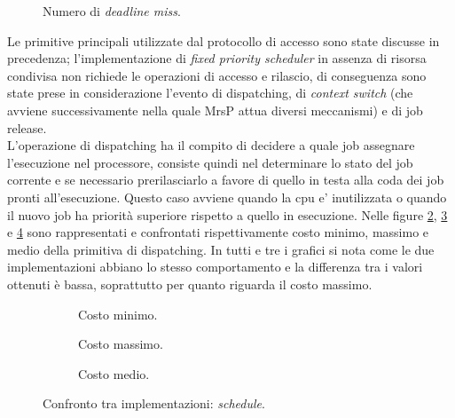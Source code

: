   \begin{figure}
    \graficoUno
    \caption{Numero di \textit{deadline miss}.} %
    \label{fig:DLM}
  \end{figure}

\noindent Le primitive principali utilizzate dal protocollo di accesso sono state discusse in precedenza; l'implementazione di \textit{fixed priority scheduler} in assenza di risorsa condivisa non richiede le operazioni di accesso e rilascio, di conseguenza sono state prese in considerazione l'evento di dispatching, di \textit{context switch} (che avviene successivamente nella quale MrsP attua diversi meccanismi) e di job release.\\

\noindent L'operazione di dispatching ha il compito di decidere a quale job assegnare l'esecuzione nel processore, consiste quindi nel determinare lo stato del job corrente e se necessario prerilasciarlo a favore di quello in testa alla coda dei job pronti all'esecuzione. Questo caso avviene quando la cpu e' inutilizzata o quando il nuovo job ha priorità superiore rispetto a quello in esecuzione. Nelle figure \ref{fig:schedMin}, \ref{fig:schedMax} e \ref{fig:schedAvg} sono rappresentati e confrontati rispettivamente costo minimo, massimo e medio della primitiva di dispatching. In tutti e tre i grafici si nota come le due implementazioni abbiano lo stesso comportamento e la differenza tra i valori ottenuti è bassa, soprattutto per quanto riguarda il costo massimo.\\

  \begin{figure}[htb]
    \centering
      \begin{subfigure}[b]{0.49\textwidth}
        \centering
        \resizebox{\linewidth}{!}\graficoSchedMIN  
        \caption{Costo minimo.}
        \label{fig:schedMin}
      \end{subfigure}
      \begin{subfigure}[b]{0.49\textwidth}
        \centering
        \resizebox{\linewidth}{!}\graficoSchedMAX
        \caption{Costo massimo.}
        \label{fig:schedMax}
      \end{subfigure}
      \begin{subfigure}[b]{0.49\textwidth}
        \centering
        \resizebox{\linewidth}{!}\graficoSchedAVG
        \caption{Costo medio.}
        \label{fig:schedAvg}
      \end{subfigure}

    \caption{Confronto tra implementazioni: \textit{schedule}.}
    \label{fig:sched}
  \end{figure}

